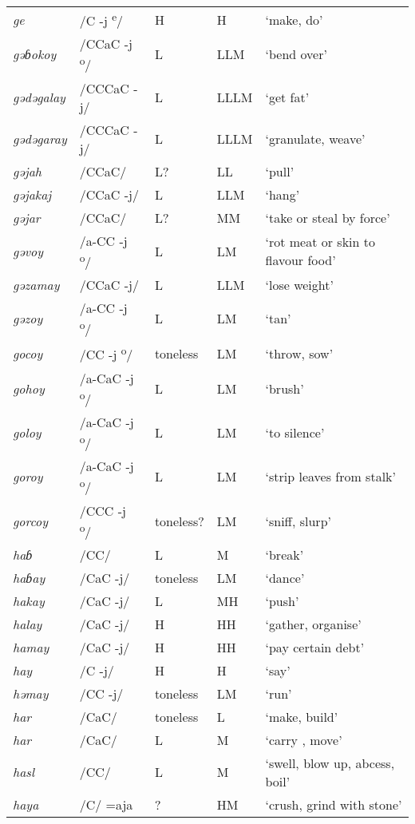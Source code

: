 \begin{small}
\begin{longtable}{lp{1.75cm}p{1.75cm}p{1.75cm}p{3cm}}
\textit{ge} & /C -j \textsuperscript{e}/ & H & H & ‘make, do’\\
\textit{gəɓokoy} & /CCaC -j\textsuperscript{ o}/ & L & LLM & ‘bend over’\\
\textit{gədəgalay} & /CCCaC -j/ & L & LLLM & ‘get fat’\\
\textit{gədəgaray} & /CCCaC -j/ & L & LLLM & ‘granulate, weave’\\
\textit{gəjah} & /CCaC/ & L? & LL & ‘pull’\\
\textit{gəjakaj} & /CCaC -j/ & L & LLM & ‘hang’\\
\textit{gəjar} & /CCaC/ & L? & MM & ‘take or steal by force’\\
\textit{gəvoy} & /a-CC -j\textsuperscript{ o}/ & L & LM & ‘rot meat or skin to flavour food’\\
\textit{gəzamay} & /CCaC -j/ & L & LLM & ‘lose weight’\\
\textit{gəzoy} & /a-CC -j\textsuperscript{ o}/ & L & LM & ‘tan’\\
\textit{gocoy} & /CC -j\textsuperscript{ o}/ & toneless & LM & ‘throw, sow’\\
\textit{gohoy} & /a-CaC -j\textsuperscript{ o}/ & L & LM & ‘brush’\\
\textit{goloy} & /a-CaC -j\textsuperscript{ o}/ & L & LM & ‘to silence’\\
\textit{goroy} & /a-CaC -j\textsuperscript{ o}/ & L & LM & ‘strip leaves from stalk’\\
\textit{gorcoy} & /CCC -j\textsuperscript{ o}/ & toneless? & LM & ‘sniff, slurp’\\
\textit{haɓ} & /CC/ & L & M & ‘break’\\
\textit{haɓay} & /CaC -j/ & toneless & LM & ‘dance’\\
\textit{hakay} & /CaC -j/ & L & MH & ‘push’\\
\textit{halay} & /CaC -j/ & H & HH & ‘gather, organise’\\
\textit{hamay} & /CaC -j/ & H & HH & ‘pay certain debt’\\
\textit{hay} & /C -j/ & H & H & ‘say’\\
\textit{həmay} & /CC -j/ & toneless & LM & ‘run’\\
\textit{har} & /CaC/ & toneless & L & ‘make, build’\\
\textit{har} & /CaC/ & L & M & ‘carry , move’\\
\textit{hasl} & /CC/ & L & M & ‘swell, blow up, abcess, boil’\\
\textit{haya} & /C/ =aja & ? & HM & ‘crush, grind with stone’\\

\end{longtable}
\end{small}
